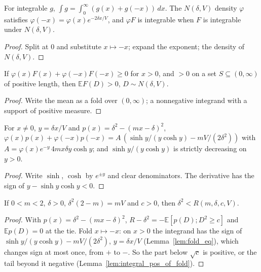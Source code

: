 \begin{lemma}\label{lem:fold}
  \leanok
  For integrable $g$, $\int g = \int_0^\infty (g(x) + g(-x))\,dx$. The $N(\delta, V)$
  density $\varphi$ satisfies $\varphi(-x) = \varphi(x)e^{-2\delta x/V}$, and $\varphi F$ is
  integrable when $F$ is integrable under $N(\delta, V)$.
\end{lemma}
\begin{proof}
  \leanok
  Split at $0$ and substitute $x \mapsto -x$; expand the exponent; the density of
  $N(\delta, V)$.
\end{proof}

\begin{lemma}\label{lem:integral_pos_of_fold}
  \leanok
  If $\varphi(x)F(x) + \varphi(-x)F(-x) \ge 0$ for $x > 0$, and $> 0$ on a set
  $S \subseteq (0, \infty)$ of positive length, then $\mathbb E F(D) > 0$, $D \sim N(\delta, V)$.
\end{lemma}
\begin{proof}
  \leanok
  Write the mean as a fold over $(0, \infty)$; a nonnegative integrand with a support of
  positive measure.
\end{proof}

\begin{lemma}\label{lem:fold_eq}
  \leanok
  For $x \ne 0$, $y = \delta x/V$ and $p(x) = \delta^2 - (mx - \delta)^2$,
  $\varphi(x)p(x) + \varphi(-x)p(-x) = A\,(\sinh y/(y\cosh y) - mV/(2\delta^2))$ with
  $A = \varphi(x)e^{-y}\,4mx\delta y\cosh y$; and $\sinh y/(y\cosh y)$ is strictly
  decreasing on $y > 0$.
\end{lemma}
\begin{proof}
  \leanok
  Write $\sinh$, $\cosh$ by $e^{\pm y}$ and clear denominators. The derivative has the
  sign of $y - \sinh y\cosh y < 0$.
\end{proof}

\begin{theorem}\label{thm:pretest_tie}
  \leanok
  If $0 < m < 2$, $\delta > 0$, $\delta^2(2 - m) = mV$ and $c > 0$, then
  $\delta^2 < R(m, \delta, c, V)$.
\end{theorem}
\begin{proof}
  \leanok
  With $p(x) = \delta^2 - (mx - \delta)^2$, $R - \delta^2 = -\mathbb E[p(D); D^2 \ge c]$
  and $\mathbb E p(D) = 0$ at the tie. Fold $x \mapsto -x$: on $x > 0$ the
  integrand has the sign of $\sinh y/(y\cosh y) - mV/(2\delta^2)$, $y = \delta x/V$
  (Lemma~\ref{lem:fold_eq}), which changes sign at most once, from $+$ to $-$. So the
  part below $\sqrt c$ is positive, or the tail beyond it negative
  (Lemma~\ref{lem:integral_pos_of_fold}).
\end{proof}

